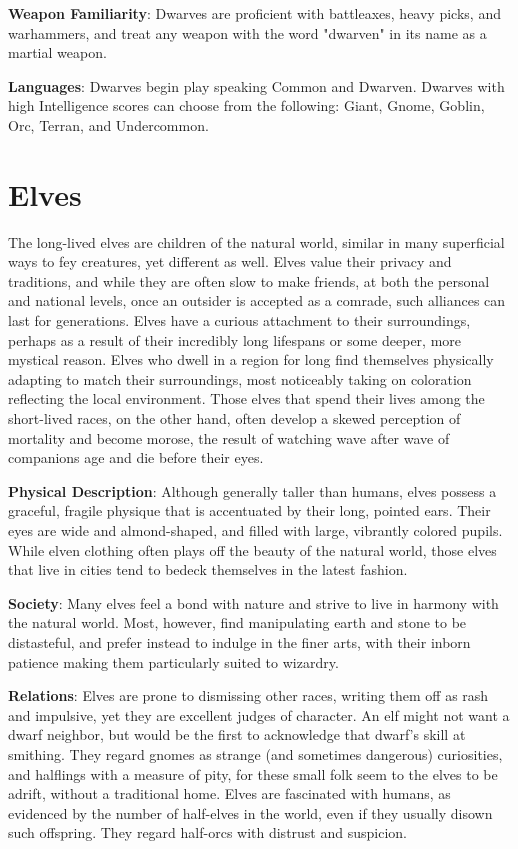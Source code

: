 \textbf{Weapon Familiarity}: Dwarves are proficient with battleaxes, heavy picks, and warhammers, and treat any weapon with the word "dwarven" in its name as a martial weapon.
				
\textbf{Languages}: Dwarves begin play speaking Common and Dwarven. Dwarves with high Intelligence scores can choose from the following: Giant, Gnome, Goblin, Orc, Terran, and Undercommon.
							
\section{Elves}

				
The long-lived elves are children of the natural world, similar in many superficial ways to fey creatures, yet different as well. Elves value their privacy and traditions, and while they are often slow to make friends, at both the personal and national levels, once an outsider is accepted as a comrade, such alliances can last for generations. Elves have a curious attachment to their surroundings, perhaps as a result of their incredibly long lifespans or some deeper, more mystical reason. Elves who dwell in a region for long find themselves physically adapting to match their surroundings, most noticeably taking on coloration reflecting the local environment. Those elves that spend their lives among the short-lived races, on the other hand, often develop a skewed perception of mortality and become morose, the result of watching wave after wave of companions age and die before their eyes.
				
\textbf{Physical Description}: Although generally taller than humans, elves possess a graceful, fragile physique that is accentuated by their long, pointed ears. Their eyes are wide and almond-shaped, and filled with large, vibrantly colored pupils. While elven clothing often plays off the beauty of the natural world, those elves that live in cities tend to bedeck themselves in the latest fashion.
				
\textbf{Society}: Many elves feel a bond with nature and strive to live in harmony with the natural world. Most, however, find manipulating earth and stone to be distasteful, and prefer instead to indulge in the finer arts, with their inborn patience making them particularly suited to wizardry.
				
\textbf{Relations}: Elves are prone to dismissing other races, writing them off as rash and impulsive, yet they are excellent judges of character. An elf might not want a dwarf neighbor, but would be the first to acknowledge that dwarf's skill at smithing. They regard gnomes as strange (and sometimes dangerous) curiosities, and halflings with a measure of pity, for these small folk seem to the elves to be adrift, without a traditional home. Elves are fascinated with humans, as evidenced by the number of half-elves in the world, even if they usually disown such offspring. They regard half-orcs with distrust and suspicion.
				
